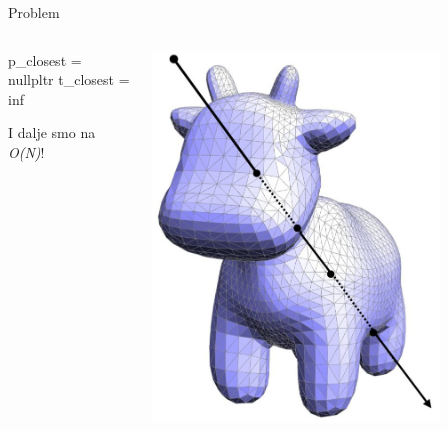 \documentclass[9pt]{beamer}
\begin{document}
\begin{frame}{Problem}
	\begin{columns}
		\begin{column}{0.5\textwidth}
			\begin{algorithm}[H]
				\SetAlgoLined
					p\_closest = nullpltr\;
					t\_closest = inf\;
			\end{algorithm}
		I dalje smo na \textit{O(N)}!
		\end{column}
		\begin{column}{0.5\textwidth}
			\begin{center}
				\includegraphics[width=0.8\textwidth]{slike/slide_008.jpg}
			\end{center}
		\end{column}
	\end{columns}
\end{frame}
\end{document}
